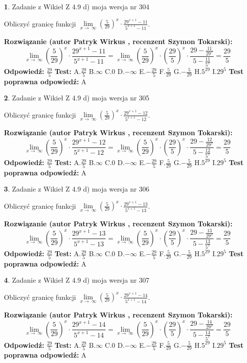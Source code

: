 \documentclass[12pt, a4paper]{article}
\theoremstyle{definition} %
\newtheorem{zad}{}
\newcommand{\zadStart}[1]{\begin{zad}#1\newline}
\newcommand{\zadStop}{\end{zad}}
\newcommand{\rozwStart}[2]{\noindent \textbf{Rozwiązanie (autor #1 , recenzent #2): }\newline}
\newcommand{\rozwStop}{\newline}
\newcommand{\odpStart}{\noindent \textbf{Odpowiedź:}\newline}
\newcommand{\odpStop}{\newline}
\newcommand{\testStart}{\noindent \textbf{Test:}\newline}
\newcommand{\testStop}{\newline}
\newcommand{\kluczStart}{\noindent \textbf{Test poprawna odpowiedź:}\newline}
\newcommand{\kluczStop}{\newline}
\begin{document}
\zadStart{Zadanie z Wikieł Z 4.9 d) moja wersja nr 304}


Obliczyć granicę funkcji  $\lim\limits_{x\to\ \infty}(\frac{5}{29})^{x}\cdot\frac{29^{x+1}-11}{5^{x+1}-11}$.
\zadStop
\rozwStart{Patryk Wirkus}{Szymon Tokarski}
$$\lim\limits_{x\to\ \infty}(\frac{5}{29})^{x}\cdot\frac{29^{x+1}-11}{5^{x+1}-11}=\lim\limits_{x\to\ \infty}(\frac{5}{29})^{x}\cdot(\frac{29}{5})^{x} \cdot \frac{29-\frac{11}{29^{x}}}{5-\frac{11}{5^{x}}} = \frac{29}{5}$$
\rozwStop
\odpStart
$\frac{29}{5}$
\odpStop
\testStart
A.$\frac{29}{5}$ B.$\infty$ C.$0$ D.$-\infty$ E.$-\frac{29}{5}$
F.$\frac{5}{29}$ G.$-\frac{5}{29}$
H.$5^{29}$
I.$29^{5}$
\testStop
\kluczStart
A
\kluczStop



\zadStart{Zadanie z Wikieł Z 4.9 d) moja wersja nr 305}


Obliczyć granicę funkcji  $\lim\limits_{x\to\ \infty}(\frac{5}{29})^{x}\cdot\frac{29^{x+1}-12}{5^{x+1}-12}$.
\zadStop
\rozwStart{Patryk Wirkus}{Szymon Tokarski}
$$\lim\limits_{x\to\ \infty}(\frac{5}{29})^{x}\cdot\frac{29^{x+1}-12}{5^{x+1}-12}=\lim\limits_{x\to\ \infty}(\frac{5}{29})^{x}\cdot(\frac{29}{5})^{x} \cdot \frac{29-\frac{12}{29^{x}}}{5-\frac{12}{5^{x}}} = \frac{29}{5}$$
\rozwStop
\odpStart
$\frac{29}{5}$
\odpStop
\testStart
A.$\frac{29}{5}$ B.$\infty$ C.$0$ D.$-\infty$ E.$-\frac{29}{5}$
F.$\frac{5}{29}$ G.$-\frac{5}{29}$
H.$5^{29}$
I.$29^{5}$
\testStop
\kluczStart
A
\kluczStop



\zadStart{Zadanie z Wikieł Z 4.9 d) moja wersja nr 306}


Obliczyć granicę funkcji  $\lim\limits_{x\to\ \infty}(\frac{5}{29})^{x}\cdot\frac{29^{x+1}-13}{5^{x+1}-13}$.
\zadStop
\rozwStart{Patryk Wirkus}{Szymon Tokarski}
$$\lim\limits_{x\to\ \infty}(\frac{5}{29})^{x}\cdot\frac{29^{x+1}-13}{5^{x+1}-13}=\lim\limits_{x\to\ \infty}(\frac{5}{29})^{x}\cdot(\frac{29}{5})^{x} \cdot \frac{29-\frac{13}{29^{x}}}{5-\frac{13}{5^{x}}} = \frac{29}{5}$$
\rozwStop
\odpStart
$\frac{29}{5}$
\odpStop
\testStart
A.$\frac{29}{5}$ B.$\infty$ C.$0$ D.$-\infty$ E.$-\frac{29}{5}$
F.$\frac{5}{29}$ G.$-\frac{5}{29}$
H.$5^{29}$
I.$29^{5}$
\testStop
\kluczStart
A
\kluczStop



\zadStart{Zadanie z Wikieł Z 4.9 d) moja wersja nr 307}


Obliczyć granicę funkcji  $\lim\limits_{x\to\ \infty}(\frac{5}{29})^{x}\cdot\frac{29^{x+1}-14}{5^{x+1}-14}$.
\zadStop
\rozwStart{Patryk Wirkus}{Szymon Tokarski}
$$\lim\limits_{x\to\ \infty}(\frac{5}{29})^{x}\cdot\frac{29^{x+1}-14}{5^{x+1}-14}=\lim\limits_{x\to\ \infty}(\frac{5}{29})^{x}\cdot(\frac{29}{5})^{x} \cdot \frac{29-\frac{14}{29^{x}}}{5-\frac{14}{5^{x}}} = \frac{29}{5}$$
\rozwStop
\odpStart
$\frac{29}{5}$
\odpStop
\testStart
A.$\frac{29}{5}$ B.$\infty$ C.$0$ D.$-\infty$ E.$-\frac{29}{5}$
F.$\frac{5}{29}$ G.$-\frac{5}{29}$
H.$5^{29}$
I.$29^{5}$
\testStop
\kluczStart
A
\kluczStop
\end{document}
